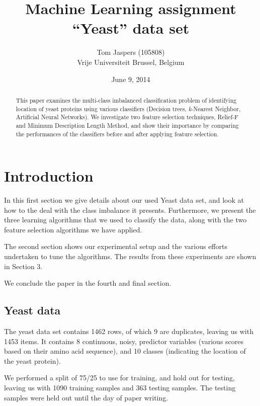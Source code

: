 \documentclass{article}
\begin{document}
\title{Machine Learning assignment
\\``Yeast'' data set}
\author{Tom Jaspers (105808)
\\Vrije Universiteit Brussel, Belgium}
\date{June 9, 2014}
\maketitle

\begin{abstract}
This paper examines the multi-class imbalanced classification problem of identifying location of yeast proteins using various classifiers (Decision trees, \textit{k}-Nearest Neighbor, Artificial Neural Networks). We investigate two feature selection techniques, Relief-F and Minimum Description Length Method, and show their importance by comparing the performances of the classifiers before and after applying feature selection.
\end{abstract}

\section{Introduction}

In this first section we give details about our used Yeast data set, and look at how to the deal with the class imbalance it presents. Furthermore, we present the three learning algorithms that we used to classify the data, along with the two feature selection algorithms we have applied.

The second section shows our experimental setup and the various efforts undertaken to tune the algorithms. The results from these experiments are shown in Section 3.

We conclude the paper in the fourth and final section.

\subsection{Yeast data}
The yeast data set contains 1462 rows, of which 9 are duplicates, leaving us with 1453 items. It contains 8 continuous, noisy, predictor variables (various scores based on their amino acid sequence), and 10 classes (indicating the location of the yeast protein). 

We performed a split of 75/25 to use for training, and hold out for testing, leaving us with 1090 training samples and 363 testing samples. The testing samples were held out until the day of paper writing.
\end{document}
